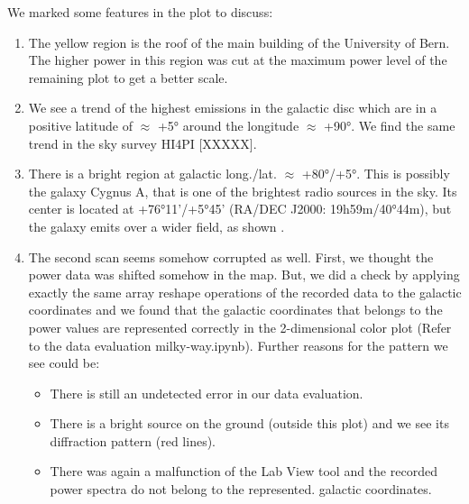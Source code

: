We marked some features in the plot to discuss:
\begin{enumerate}
	\item The yellow region is the roof of the main building of the University of Bern. The higher power in this region was cut at the maximum power level of the remaining plot to get a better scale.
	\item We see a trend of the highest emissions in the galactic disc which are in a positive latitude of $\approx$ +5° around the longitude $\approx$ +90°. We find the same trend in the sky survey HI4PI [XXXXX].
	\item There is a bright region at galactic long./lat. $\approx$ +80°/+5°. This is possibly the galaxy Cygnus A, that is one of the brightest radio sources in the sky. Its center is located at +76°11'/+5°45' (RA/DEC J2000: 19h59m/40°44m), but the galaxy emits over a wider field, as shown \cite{noauthor_reeve_celestialradiosources_nodate}.
	\item The second scan seems somehow corrupted as well. First, we thought the power data was shifted somehow in the map. But, we did a check by applying exactly the same array reshape operations of the recorded data to the galactic coordinates and we found that the galactic coordinates that belongs to the power values are represented correctly in the 2-dimensional color plot (Refer to the data evaluation milky-way.ipynb). Further reasons for the pattern we see could be:
	\begin{itemize}
		\item There is still an undetected error in our data evaluation.
		\item There is a bright source on the ground (outside this plot) and we see its diffraction pattern (red lines).
		\item There was again a malfunction of the Lab View tool and the recorded power spectra do not belong to the represented. galactic coordinates.
	\end{itemize}
\end{enumerate}